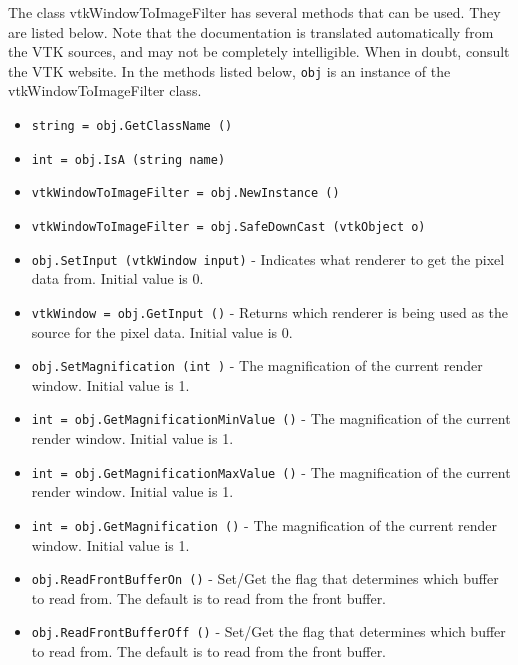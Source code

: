 The class vtkWindowToImageFilter has several methods that can be used.
  They are listed below.
Note that the documentation is translated automatically from the VTK sources,
and may not be completely intelligible.  When in doubt, consult the VTK website.
In the methods listed below, \verb|obj| is an instance of the vtkWindowToImageFilter class.
\begin{itemize}
\item  \verb|string = obj.GetClassName ()|

\item  \verb|int = obj.IsA (string name)|

\item  \verb|vtkWindowToImageFilter = obj.NewInstance ()|

\item  \verb|vtkWindowToImageFilter = obj.SafeDownCast (vtkObject o)|

\item  \verb|obj.SetInput (vtkWindow input)| -  Indicates what renderer to get the pixel data from. Initial value is 0.

\item  \verb|vtkWindow = obj.GetInput ()| -  Returns which renderer is being used as the source for the pixel data.
 Initial value is 0.

\item  \verb|obj.SetMagnification (int )| -  The magnification of the current render window. Initial value is 1.

\item  \verb|int = obj.GetMagnificationMinValue ()| -  The magnification of the current render window. Initial value is 1.

\item  \verb|int = obj.GetMagnificationMaxValue ()| -  The magnification of the current render window. Initial value is 1.

\item  \verb|int = obj.GetMagnification ()| -  The magnification of the current render window. Initial value is 1.

\item  \verb|obj.ReadFrontBufferOn ()| -  Set/Get the flag that determines which buffer to read from.
 The default is to read from the front buffer.   

\item  \verb|obj.ReadFrontBufferOff ()| -  Set/Get the flag that determines which buffer to read from.
 The default is to read from the front buffer.   


\end{itemize}
